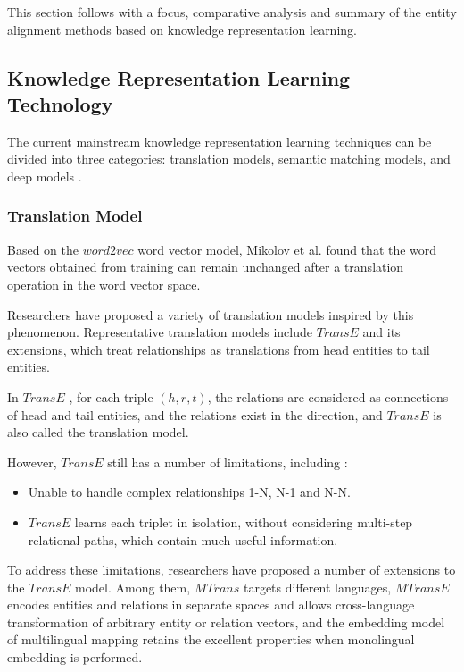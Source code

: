 \documentclass[sigconf]{acmart}
\begin{document}
{This section follows with a focus, comparative analysis and summary of the entity alignment methods based on knowledge representation learning.
\subsection{Knowledge Representation Learning Technology}
The current mainstream knowledge representation learning techniques can be divided into three categories: translation models, semantic matching models, and deep models \cite{wang2017knowledge}.

\subsubsection{Translation Model}

Based on the $word2vec$ word vector model, Mikolov et al.\cite{mikolov2013distributed} found that the word vectors obtained from training can remain unchanged after a translation operation in the word vector space.

Researchers have proposed a variety of translation models inspired by this phenomenon. Representative translation models include $TransE$ \cite{bordes2013translating} and its extensions, which treat relationships as translations from head entities to tail entities.

In $TransE$  \cite{bordes2013translating} , for each triple $(h,r,t)$, the relations are considered as connections of head and tail entities, and the relations exist in the direction, and $TransE$ is also called the translation model.

However, $TransE$ still has a number of limitations, including :
\begin{itemize}
    \item Unable to handle complex relationships 1-N, N-1 and N-N. 
    \item $TransE$ learns each triplet in isolation, without considering multi-step relational paths, which contain much useful information.
\end{itemize}

To address these limitations, researchers have proposed a number of extensions to the $TransE$ \cite{chen2016multilingual} model. Among them, $MTrans$ targets different languages, $MTransE$ encodes entities and relations in separate spaces and allows cross-language transformation of arbitrary entity or relation vectors, and the embedding model of multilingual mapping retains the excellent properties when monolingual embedding is performed.

}
\end{document}
